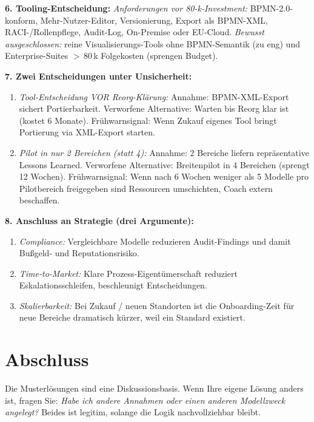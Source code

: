 \documentclass[11pt,a4paper,oneside]{article}
\begin{document}
\begin{loesungbox}
\smallskip
\textbf{6. Tooling-Entscheidung:} \emph{Anforderungen vor 80-k-Investment:} BPMN-2.0-konform, Mehr-Nutzer-Editor, Versionierung, Export als BPMN-XML, RACI-/Rollenpflege, Audit-Log, On-Premise oder EU-Cloud. \emph{Bewusst ausgeschlossen:} reine Visualisierungs-Tools ohne BPMN-Semantik (zu eng) und Enterprise-Suites $>$\,80\,k Folgekosten (sprengen Budget).

\smallskip
\textbf{7. Zwei Entscheidungen unter Unsicherheit:}
\begin{enumerate}
  \item \emph{Tool-Entscheidung VOR Reorg-Kl\"arung:} Annahme: BPMN-XML-Export sichert Portierbarkeit. Verworfene Alternative: Warten bis Reorg klar ist (kostet 6 Monate). Fr\"uhwarnsignal: Wenn Zukauf eigenes Tool bringt \textrightarrow{} Portierung via XML-Export starten.
  \item \emph{Pilot in nur 2 Bereichen (statt 4):} Annahme: 2 Bereiche liefern repr\"asentative Lessons Learned. Verworfene Alternative: Breitenpilot in 4 Bereichen (sprengt 12 Wochen). Fr\"uhwarnsignal: Wenn nach 6 Wochen weniger als 5 Modelle pro Pilotbereich freigegeben sind \textrightarrow{} Ressourcen umschichten, Coach extern beschaffen.
\end{enumerate}

\smallskip
\textbf{8. Anschluss an Strategie (drei Argumente):}
\begin{enumerate}
  \item \emph{Compliance:} Vergleichbare Modelle reduzieren Audit-Findings und damit Bu{\ss}geld- und Reputationsrisiko.
  \item \emph{Time-to-Market:} Klare Prozess-Eigent\"umerschaft reduziert Eskalations\-schleifen, beschleunigt Entscheidungen.
  \item \emph{Skalierbarkeit:} Bei Zukauf / neuen Standorten ist die Onboarding-Zeit f\"ur neue Bereiche dramatisch k\"urzer, weil ein Standard existiert.
\end{enumerate}
\end{loesungbox}

\clearpage

\section*{Abschluss}
\thispagestyle{plain}

\noindent Die Musterl\"osungen sind eine Diskussionsbasis. Wenn Ihre eigene L\"osung anders ist, fragen Sie: \emph{Habe ich andere Annahmen \textendash{} oder einen anderen Modellzweck angelegt?} Beides ist legitim, solange die Logik nachvollziehbar bleibt.
\end{document}
